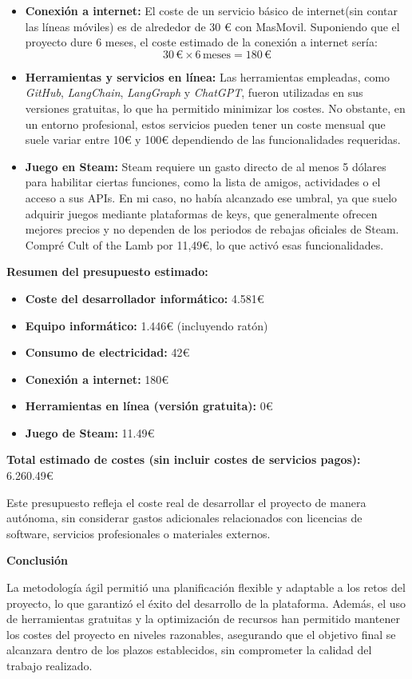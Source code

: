 \begin{itemize}
    \item \textbf{Conexión a internet:} El coste de un servicio básico de internet(sin contar las líneas móviles) es de alrededor de 30 € con MasMovil. Suponiendo que el proyecto dure 6 meses, el coste estimado de la conexión a internet sería:
    \[
    30 \, \text{€} \times 6 \, \text{meses} = 180 \, \text{€}
    \]

    \item \textbf{Herramientas y servicios en línea:} Las herramientas empleadas, como \textit{GitHub}, \textit{LangChain}, \textit{LangGraph} y \textit{ChatGPT}, fueron utilizadas en sus versiones gratuitas, lo que ha permitido minimizar los costes. No obstante, en un entorno profesional, estos servicios pueden tener un coste mensual que suele variar entre 10€ y 100€ dependiendo de las funcionalidades requeridas.

    \item \textbf{Juego en Steam:} Steam requiere un gasto directo de al menos 5 dólares para habilitar ciertas funciones, como la lista de amigos, actividades o el acceso a sus APIs. En mi caso, no había alcanzado ese umbral, ya que suelo adquirir juegos mediante plataformas de keys, que generalmente ofrecen mejores precios y no dependen de los periodos de rebajas oficiales de Steam. Compré Cult of the Lamb por 11,49€, lo que activó esas funcionalidades.
    
\end{itemize}

\textbf{Resumen del presupuesto estimado:}

\begin{itemize}
    \item \textbf{Coste del desarrollador informático:} 4.581€
    \item \textbf{Equipo informático:} 1.446€ (incluyendo ratón)
    \item \textbf{Consumo de electricidad:} 42€
    \item \textbf{Conexión a internet:} 180€
    \item \textbf{Herramientas en línea (versión gratuita):} 0€
    \item \textbf{Juego de Steam:} 11.49€
\end{itemize}

\textbf{Total estimado de costes (sin incluir costes de servicios pagos):} 6.260.49€

Este presupuesto refleja el coste real de desarrollar el proyecto de manera autónoma, sin considerar gastos adicionales relacionados con licencias de software, servicios profesionales o materiales externos.

\textbf{Conclusión}


La metodología ágil permitió una planificación flexible y adaptable a los retos del proyecto, lo que garantizó el éxito del desarrollo de la plataforma. Además, el uso de herramientas gratuitas y la optimización de recursos han permitido mantener los costes del proyecto en niveles razonables, asegurando que el objetivo final se alcanzara dentro de los plazos establecidos, sin comprometer la calidad del trabajo realizado.


